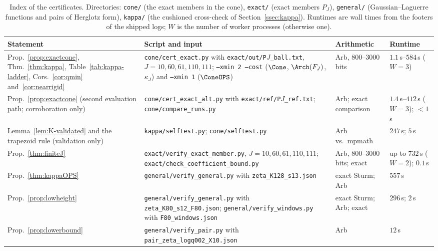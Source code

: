 \begin{table}[ht]
\centering\scriptsize
\caption{Index of the certificates. Directories: \texttt{cone/} (the exact members in the cone), \texttt{exact/} (exact
members $P_J$), \texttt{general/} (Gaussian--Laguerre functions and pairs of Herglotz form), \texttt{kappa/} (the cushioned
cross-check of Section~\ref{ssec:kappa}). Runtimes are wall times from the footers of the shipped logs; $W$ is the number of
worker processes (otherwise one).}\label{tab:anc-index}
\begin{tabular}{@{}>{\raggedright\arraybackslash}p{}>{\raggedright\arraybackslash}p{}>{\raggedright\arraybackslash}p{}>{\raggedright\arraybackslash}p{}@{}}
\toprule
Statement & Script and input & Arithmetic & Runtime \\
\midrule
Prop.~\ref{prop:exactcone}, Thm.~\ref{thm:kappa}, Table~\ref{tab:kappa-ladder}, Cors.~\ref{cor:qmin} and~\ref{cor:nearrigid} &
\nolinkurl{cone/cert_exact.py} with \nolinkurl{exact/out/P}$J$\nolinkurl{_ball.txt}, $J=10,60,61,110,111$; \texttt{--xmin 2 --cost} ($\Cone$,
$\Arch(F_J)$, $\kappa_J$) and \texttt{--xmin 1} ($\ConeOPS$) & Arb, $800$--$3000$ bits & $1.1$\,s--$584$\,s ($W=3$) \\
Prop.~\ref{prop:exactcone} (second evaluation path; corroboration only) & \nolinkurl{cone/cert_exact_alt.py} with
\nolinkurl{exact/ref/P}$J$\nolinkurl{_ref.txt}; \nolinkurl{cone/compare_runs.py} & Arb; exact comparison & $1.4$\,s--$412$\,s ($W=3$); $<1$\,s \\
Lemma~\ref{lem:K-validated} and the trapezoid rule (validation only) & \nolinkurl{kappa/selftest.py}; \nolinkurl{cone/selftest.py} & Arb vs.\
mpmath & $247$\,s; $5$\,s \\
Prop.~\ref{thm:finiteJ} & \nolinkurl{exact/verify_exact_member.py}, $J=10,60,61,110,111$; \nolinkurl{exact/check_coefficient_bound.py} & Arb, $800$--$3000$ bits; exact & up to $732$\,s ($W=2$); $0.1$\,s \\
Prop.~\ref{thm:kappaOPS} & \nolinkurl{general/verify_general.py} with \nolinkurl{zeta_K128_s13.json} & exact Sturm; Arb & $557$\,s \\
Prop.~\ref{prop:lowheight} & \nolinkurl{general/verify_general.py} with \nolinkurl{zeta_K80_s12_F80.json};
\nolinkurl{general/verify_windows.py} with \nolinkurl{F80_windows.json} & exact Sturm; Arb; exact & $296$\,s; $2$\,s \\
Prop.~\ref{prop:lowerbound} & \nolinkurl{general/verify_pair.py} with \nolinkurl{pair_zeta_logq002_X10.json} & Arb & $12$\,s \\

\end{tabular}
\end{table}
